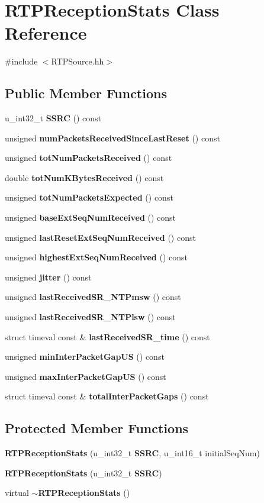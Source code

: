 \section{R\+T\+P\+Reception\+Stats Class Reference}
\label{classRTPReceptionStats}


{\ttfamily \#include $<$R\+T\+P\+Source.\+hh$>$}

\subsection*{Public Member Functions}
\begin{DoxyCompactItemize}
\item 
u\+\_\+int32\+\_\+t {\bf S\+S\+R\+C} () const 
\item 
unsigned {\bf num\+Packets\+Received\+Since\+Last\+Reset} () const 
\item 
unsigned {\bf tot\+Num\+Packets\+Received} () const 
\item 
double {\bf tot\+Num\+K\+Bytes\+Received} () const 
\item 
unsigned {\bf tot\+Num\+Packets\+Expected} () const 
\item 
unsigned {\bf base\+Ext\+Seq\+Num\+Received} () const 
\item 
unsigned {\bf last\+Reset\+Ext\+Seq\+Num\+Received} () const 
\item 
unsigned {\bf highest\+Ext\+Seq\+Num\+Received} () const 
\item 
unsigned {\bf jitter} () const 
\item 
unsigned {\bf last\+Received\+S\+R\+\_\+\+N\+T\+Pmsw} () const 
\item 
unsigned {\bf last\+Received\+S\+R\+\_\+\+N\+T\+Plsw} () const 
\item 
struct timeval const \& {\bf last\+Received\+S\+R\+\_\+time} () const 
\item 
unsigned {\bf min\+Inter\+Packet\+Gap\+U\+S} () const 
\item 
unsigned {\bf max\+Inter\+Packet\+Gap\+U\+S} () const 
\item 
struct timeval const \& {\bf total\+Inter\+Packet\+Gaps} () const 
\end{DoxyCompactItemize}
\subsection*{Protected Member Functions}
\begin{DoxyCompactItemize}
\item 
{\bf R\+T\+P\+Reception\+Stats} (u\+\_\+int32\+\_\+t {\bf S\+S\+R\+C}, u\+\_\+int16\+\_\+t initial\+Seq\+Num)
\item 
{\bf R\+T\+P\+Reception\+Stats} (u\+\_\+int32\+\_\+t {\bf S\+S\+R\+C})
\item 
virtual {\bf $\sim$\+R\+T\+P\+Reception\+Stats} ()
\end{DoxyCompactItemize}
